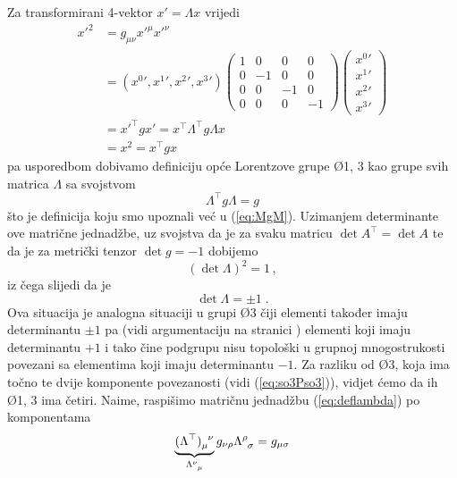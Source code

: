 Za transformirani 4-vektor $x' = \Lambda x$ vrijedi
\begin{align}
 {x'}^2 &= g_{\mu\nu} {x'}^\mu {x'}^\nu \\
        &= ({x^0}', {x^1}', {x^2}', {x^3}')
\begin{pmatrix}
1 & 0 & 0 & 0 \\
0 &-1 & 0 & 0 \\
0 & 0 &-1 & 0 \\
0 & 0 & 0 &-1
\end{pmatrix}
\begin{pmatrix}
{x^0}' \\ {x^1}' \\ {x^2}' \\ {x^3}'
\end{pmatrix} \\
  &= {x'}^{\top} g x' = x^\top \Lambda^\top g \Lambda x \\
  &= x^2 = x^\top g x
\end{align}
pa usporedbom dobivamo definiciju opće Lorentzove grupe
\O{1, 3}
kao grupe svih matrica $\Lambda$ sa svojstvom
\begin{equation}
   \Lambda^\top g \Lambda = g
\label{deflambda}
\end{equation}
što je definicija koju smo upoznali već u (\ref{eq:MgM}).
Uzimanjem determinante ove matrične jednadžbe, uz svojstva
da je za svaku matricu $\det A^\top = \det A$ te da je za
metrički tenzor $\det g = -1$ dobijemo 
\begin{equation}
   (\det \Lambda)^2 = 1 \,,
\end{equation}
iz čega slijedi da je
\begin{equation}
   \det\Lambda = \pm 1 \;.
\label{detL}
\end{equation}
Ova situacija je analogna situaciji u grupi \O{3} čiji elementi
također imaju determinantu $\pm 1$ pa (vidi argumentaciju na
stranici \pageref{pag:povezanostO3}) elementi koji imaju
determinantu $+1$ i tako čine podgrupu  nisu topološki
u grupnoj mnogostrukosti povezani sa elementima koji imaju
determinantu $-1$. Za razliku od \O{3}, koja ima točno te
dvije komponente povezanosti (vidi (\ref{eq:so3Pso3})), 
vidjet ćemo da ih \O{1, 3} ima četiri.
Naime, raspišimo matričnu jednadžbu (\ref{eq:deflambda})  po komponentama
\begin{equation}
    \underbrace{\tensor{(\Lambda^\top)}{_{\mu}^{\nu}}}_{\tensor{\Lambda}{^{\nu}_{\mu}}}
    g_{\nu\rho}\tensor{\Lambda}{^{\rho}_{\sigma}} = g_{\mu\sigma}
\end{equation}
